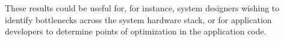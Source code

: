 \documentclass[portrait, a1]{KTHEEposter}
\begin{document}
\begin{pcolumns}[3]
\begin{pcolumn}[2]
\begin{pframe}[1.27]
                 These results could be useful for, for instance, system designers wishing to identify bottlenecks across the system hardware stack, or for application developers to determine points of optimization in the application code.
            \end{pframe}
            \begin{pframe**}
                \nocite{*}
                \small
                \printbibliography
            \end{pframe**}
        \end{pcolumn}
    \end{pcolumns}
    
\end{document}
